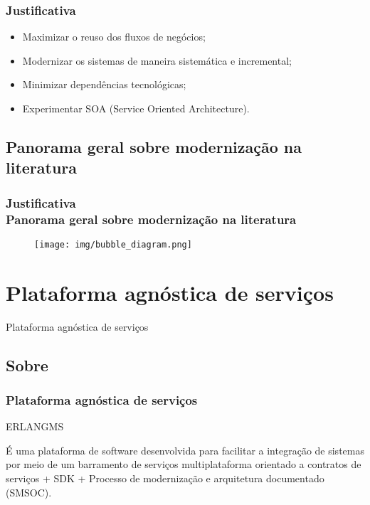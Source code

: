 \documentclass{beamer}
\begin{document}
\begin{frame}
  \frametitle{Justificativa}
  
    \begin{itemize}
       \item<1->Maximizar o reuso dos fluxos de negócios;
       \item<1->Modernizar os sistemas de maneira sistemática e incremental;
       \item<1->Minimizar dependências tecnológicas; 
       \item<1->Experimentar SOA (Service Oriented Architecture).
    \end{itemize}
    
\end{frame}


\subsection{Panorama geral sobre modernização na literatura}


\begin{frame}
  \frametitle{Justificativa \\ \small{Panorama geral sobre modernização na literatura}}

  	
	\begin{figure}
	\centering
		\texttt{[image: img/bubble\_diagram.png]}
	\end{figure}
  
\end{frame}





\section{Plataforma agnóstica de serviços}


\begin{frame}[c]{ }
\centering
  \huge{Plataforma agnóstica de serviços}
\end{frame}



\subsection{Sobre}


\begin{frame}
  \frametitle{Plataforma agnóstica de serviços}

  \begin{exampleblock}{ERLANGMS}
  
É uma plataforma de software desenvolvida para facilitar a integração de sistemas por meio de um barramento 
de serviços multiplataforma orientado a contratos de serviços + SDK + Processo de modernização e arquitetura documentado (SMSOC).

  \end{exampleblock}

  
\end{frame}
\end{document}

